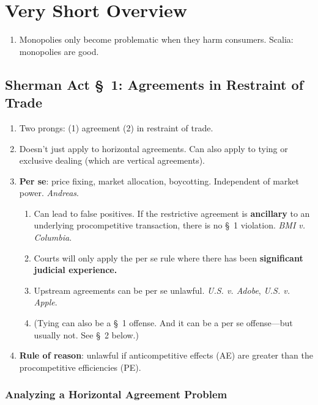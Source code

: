 \section{Very Short Overview}

\begin{enumerate}
    \item Monopolies only become problematic when they harm consumers. Scalia: 
    monopolies are good.
\end{enumerate}

\subsection{Sherman Act \S\ 1: Agreements in Restraint of Trade}

\begin{enumerate}
    \item Two prongs: (1) agreement (2) in restraint of trade.
    \item Doesn't just apply to horizontal agreements. Can also apply to 
    tying or exclusive dealing (which are vertical agreements).
    \item \textbf{Per se}: price fixing, market allocation, boycotting. 
    Independent of market power. \emph{Andreas}.
    \begin{enumerate}
        \item Can lead to false positives. If the restrictive agreement is 
        \textbf{ancillary} to an underlying procompetitive transaction, there 
        is no \S\ 1 violation. \emph{BMI v. Columbia}.
        \item Courts will only apply the per se rule where there has been 
        \textbf{significant judicial experience.}
        \item Upstream agreements can be per se unlawful. \emph{U.S. v. 
        Adobe}, \emph{U.S. v. Apple}. %
        \item (Tying can also be a \S\ 1 offense. And it can be a per se 
        offense---but usually not. See \S\ 2 below.)
    \end{enumerate}
    \item \textbf{Rule of reason}: unlawful if anticompetitive effects (AE) 
    are greater than the procompetitive efficiencies (PE).
\end{enumerate}

\subsubsection{Analyzing a Horizontal Agreement Problem}


